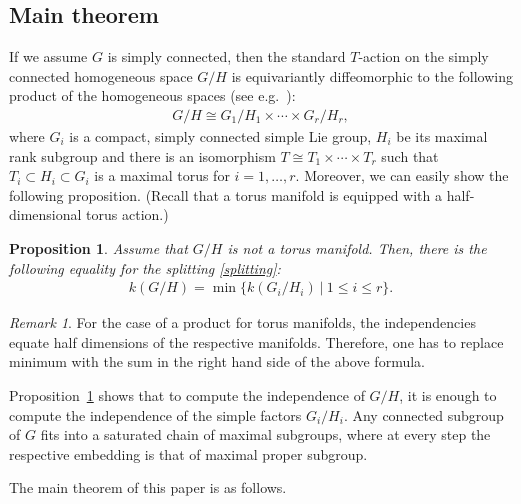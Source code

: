 \documentclass{amsart}
\newtheorem{proposition}[theorem]{Proposition}
\theoremstyle{definition}
\theoremstyle{remark}
\newtheorem{remark}[theorem]{Remark}
\numberwithin{equation}{section}
\begin{document}
\subsection{Main theorem}
\label{sect:3.1}
If we assume $G$ is simply connected, then the standard $T$-action on the simply connected homogeneous space $G/H$ is equivariantly diffeomorphic to the following product of the homogeneous spaces (see e.g.~\cite[Section 2.2]{Ku10}):
\begin{align}
\label{splitting}
G/H\cong G_{1}/H_{1}\times \cdots \times G_{r}/H_{r},
\end{align}
where $G_{i}$ is a compact, simply connected simple Lie group, $H_{i}$ be its maximal rank subgroup and there is an isomorphism $T\cong T_{1}\times \cdots \times T_{r}$ such that $T_{i}\subset H_{i}\subset G_{i}$ is a maximal torus for $i=1,\ldots, r$. 
Moreover, we can easily show the following proposition. (Recall that a torus manifold is equipped with a half-dimensional torus action.)
\begin{proposition}
\label{split_computation}
Assume that $G/H$ is not a torus manifold. 
Then, there is the following equality for the splitting \eqref{splitting}:
\begin{align*}
k(G/H)=\min \{k(G_{i}/H_{i})\ |\ 1\le i\le r \}.
\end{align*}
\end{proposition} 

\begin{remark}
For the case of a product for torus manifolds, the independencies equate half dimensions of the respective manifolds.
Therefore, one has to replace minimum with the sum in the right hand side of the above formula.
\end{remark}

Proposition~\ref{split_computation} shows that to compute the independence of $G/H$,  it is enough to compute the independence of the simple factors $G_{i}/H_{i}$.
Any connected subgroup of $G$ fits into a saturated chain of maximal subgroups, where at every step the respective embedding is that of maximal proper subgroup.

The main theorem of this paper is as follows.
\end{document}
